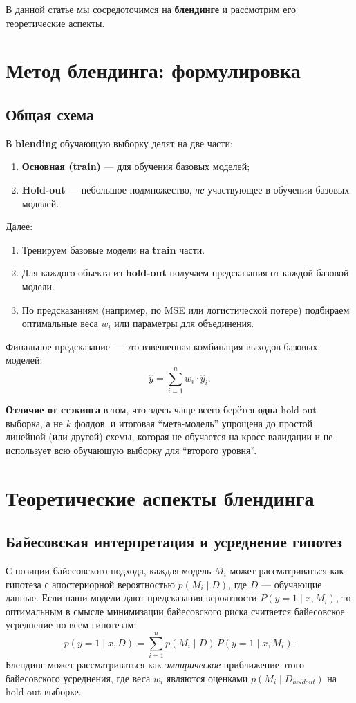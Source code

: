 В данной статье мы сосредоточимся на \textbf{блендинге} и рассмотрим его теоретические аспекты.

\section{Метод блендинга: формулировка}
\subsection{Общая схема}
В \textbf{blending} обучающую выборку делят на две части:
\begin{enumerate}
    \item \textbf{Основная (train)} --- для обучения базовых моделей;
    \item \textbf{Hold-out} --- небольшое подмножество, \textit{не} участвующее в обучении базовых моделей.
\end{enumerate}

Далее:
\begin{enumerate}
    \item Тренируем базовые модели на \textbf{train} части.
    \item Для каждого объекта из \textbf{hold-out} получаем предсказания от каждой базовой модели.
    \item По предсказаниям (например, по MSE или логистической потере) подбираем оптимальные веса $w_i$ или параметры для объединения.  
\end{enumerate}

Финальное предсказание --- это взвешенная комбинация выходов базовых моделей:
\[
\hat{y} = \sum_{i=1}^n w_i \cdot \hat{y}_i.
\]

\textbf{Отличие от стэкинга} в том, что здесь чаще всего берётся \textbf{одна} hold-out выборка, а не $k$ фолдов, и итоговая ``мета-модель'' упрощена до простой линейной (или другой) схемы, которая не обучается на кросс-валидации и не использует всю обучающую выборку для ``второго уровня''.

\section{Теоретические аспекты блендинга}
\subsection{Байесовская интерпретация и усреднение гипотез}
С позиции байесовского подхода, каждая модель $M_i$ может рассматриваться как гипотеза с апостериорной вероятностью $p(M_i \mid D)$, где $D$ --- обучающие данные. Если наши модели дают предсказания вероятности $P(y=1 \mid x, M_i)$, то оптимальным в смысле минимизации байесовского риска считается байесовское усреднение по всем гипотезам:
\[
p(y=1 \mid x, D) = \sum_{i=1}^n p(M_i \mid D) \, P(y=1 \mid x, M_i).
\]
Блендинг может рассматриваться как \textit{эмпирическое} приближение этого байесовского усреднения, где веса $w_i$ являются оценками $p(M_i \mid D_{holdout})$ на hold-out выборке.


